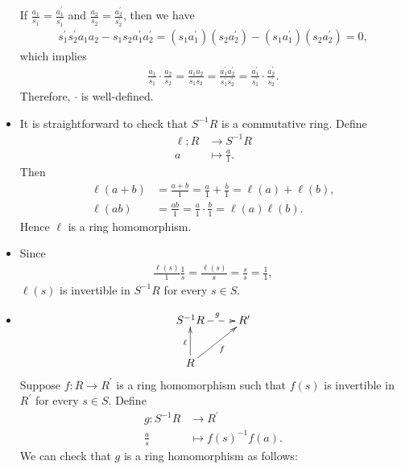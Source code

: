 \begin{solution}
\begin{itemize}
        If $\frac{a_1}{s_1} = \frac{a_1^\prime}{s_1^\prime}$ and $\frac{a_2}{s_2} = \frac{a_2^\prime}{s_2^\prime}$, then we have
        \begin{align*}
           s_1^\prime s_2^\prime a_1a_2 - s_1 s_2 a_1^\prime a_2^\prime=(s_1 a_1^\prime )( s_2 a_2^\prime) -(s_1a_1^\prime )  (s_2a_2^\prime )=0,
        \end{align*}
        which implies
        \begin{align*}
            \frac{a_1}{s_1}\cdot \frac{a_2}{s_2}=\frac{a_1a_2}{s_1s_2}= \frac{a_1^\prime a_2^\prime}{s_1^\prime s_2^\prime}=\frac{a_1^\prime}{s_1^\prime}\cdot \frac{a_2^\prime}{s_2^\prime}.
        \end{align*}
        Therefore, $\cdot$ is well-defined.
        \item It is straightforward to check that $S^{-1} R$ is a commutative ring. Define
        \begin{align*}
            \ell: R &\longrightarrow S^{-1} R\\
            a &\longmapsto \frac{a}{1}.
        \end{align*}
        Then
        \begin{align*}
            \ell(a+b)&=\frac{a+b}{1}=\frac{a}{1}+\frac{b}{1}= \ell(a)+\ell(b),\\
            \ell(ab)&=\frac{ab}{1}=\frac{a}{1}\cdot\frac{b}{1}=\ell(a)\ell(b).
        \end{align*}
        Hence $\ell$ is a ring homomorphism.
        \item Since
        \begin{align*}
            \frac{\ell(s)}{1}\frac{1}{s}=\frac{\ell(s)}{s}=\frac{s}{s}=\frac{1}{1},
        \end{align*}
        $\ell(s)$ is invertible in $S^{-1}R$ for every $s \in S$.
        \item 
        \[\xymatrix{
			S^{-1}R
            \ar@{-->}[r]^{g} & R'\\
			R\ar[ru]_{f}\ar[u]^{\ell} &    
		}\]
        Suppose $f: R \rightarrow R^{\prime}$ is a ring homomorphism such that $f(s)$ is invertible in $R^{\prime}$ for every $s \in S$. Define
        \begin{align*}
            g: S^{-1}R &\longrightarrow R^{\prime}\\
            \frac{a}{s} &\longmapsto f(s)^{-1}f(a).
        \end{align*}
        We can check that $g$ is a ring homomorphism as follows:
        \begin{align*}

\end{align*}
\end{itemize}
\end{solution}
